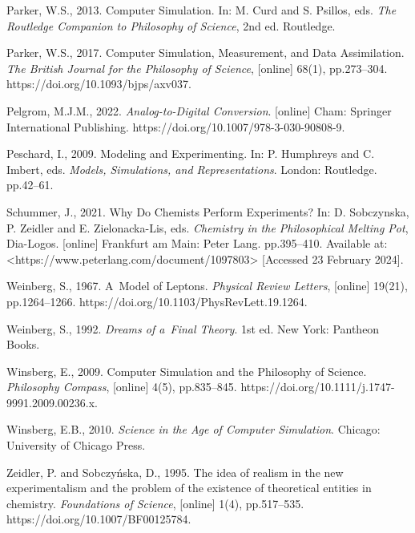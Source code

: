 Parker, W.S., 2013. Computer Simulation. In: M. Curd and S. Psillos, eds. \textit{The Routledge Companion to Philosophy of Science}, 2nd ed. Routledge.



Parker, W.S., 2017. Computer Simulation, Measurement, and Data Assimilation. \textit{The British Journal for the Philosophy of Science}, [online] 68(1), pp.273–304. https://doi.org/10.1093/bjps/axv037.



Pelgrom, M.J.M., 2022. \textit{Analog-to-Digital Conversion}. [online] Cham: Springer International Publishing. https://doi.org/10.1007/978-3-030-90808-9.



Peschard, I., 2009. Modeling and Experimenting. In: P. Humphreys and C. Imbert, eds. \textit{Models, Simulations, and Representations}. London: Routledge. pp.42–61.



Schummer, J., 2021. Why Do Chemists Perform Experiments? In: D. Sobczynska, P. Zeidler and E. Zielonacka-Lis, eds. \textit{Chemistry in the Philosophical Melting Pot}, Dia-Logos. [online] Frankfurt am Main: Peter Lang. pp.395–410. Available at: {\textless}https://www.peterlang.com/document/1097803{\textgreater} [Accessed 23 February 2024].



Weinberg, S., 1967. A~Model of Leptons. \textit{Physical Review Letters}, [online] 19(21), pp.1264–1266. https://doi.org/10.1103/PhysRevLett.19.1264.



Weinberg, S., 1992. \textit{Dreams of a~Final Theory}. 1st ed. New York: Pantheon Books.



Winsberg, E., 2009. Computer Simulation and the Philosophy of Science. \textit{Philosophy Compass}, [online] 4(5), pp.835–845. https://doi.org/10.1111/j.1747-9991.2009.00236.x.



Winsberg, E.B., 2010. \textit{Science in the Age of Computer Simulation}. Chicago: University of Chicago Press.



Zeidler, P. and Sobczyńska, D., 1995. The idea of realism in the new experimentalism and the problem of the existence of theoretical entities in chemistry. \textit{Foundations of Science}, [online] 1(4), pp.517–535. https://doi.org/10.1007/BF00125784.



